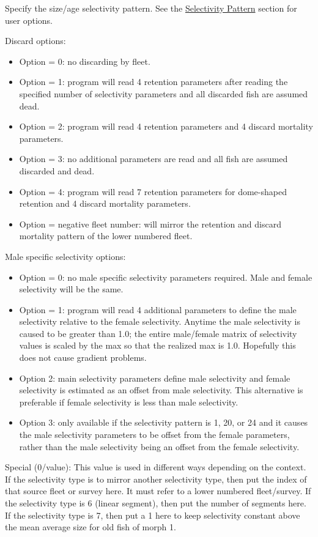 Specify the size/age selectivity pattern. See the \hyperlink{SelexPattern}{Selectivity Pattern} section for user options.

\hypertarget{DomeRetention}{Discard options:}
\begin{itemize}
	\item Option = 0: no discarding by fleet.
	\item Option = 1: program will read 4 retention parameters after reading the specified number of selectivity parameters and all discarded fish are assumed dead.  
	\item Option = 2: program will read 4 retention parameters and 4 discard mortality parameters.  
	\item Option = 3: no additional parameters are read and all fish are assumed discarded and dead.
	\item Option = 4: program will read 7 retention parameters for dome-shaped retention and 4 discard mortality parameters.  
	\item Option = negative fleet number: will mirror the retention and discard mortality pattern of the lower numbered fleet.
\end{itemize}

Male specific selectivity options:
\begin{itemize}
	\item Option = 0: no male specific selectivity parameters required. Male and female selectivity will be the same.
	\item Option = 1: program will read 4 additional parameters to define the male selectivity relative to the female selectivity.  Anytime the male selectivity is caused to be greater than 1.0; the entire male/female matrix of selectivity values is scaled by the max so that the realized max is 1.0.  Hopefully this does not cause gradient problems.  
	\item Option 2: main selectivity parameters define male selectivity and female selectivity is estimated as an offset from male selectivity.  This alternative is preferable if female selectivity is less than male selectivity.  
	\item Option 3: only available if the selectivity pattern is 1, 20, or 24 and it causes the male selectivity parameters to be offset from the female parameters, rather than the male selectivity being an offset from the female selectivity.
\end{itemize}

Special (0/value): This value is used in different ways depending on the context.  If the selectivity type is to mirror another selectivity type, then put the index of that source fleet or survey here.  It must refer to a lower numbered fleet/survey.  If the selectivity type is 6 (linear segment), then put the number of segments here.  If the selectivity type is 7, then put a 1 here to keep selectivity constant above the mean average size for old fish of morph 1.

